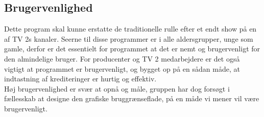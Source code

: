 \subsection{Brugervenlighed}
Dette program skal kunne erstatte de traditionelle rulle efter et endt show på en af TV 2s kanaler. Seerne til disse programmer er i alle aldersgrupper, unge som gamle, derfor er det essentielt for programmet at det er nemt og brugervenligt for den almindelige bruger. For producenter og TV 2 medarbejdere er det også vigtigt at programmet er brugervenligt, og bygget op på en sådan måde, at indtastning af krediteringer er hurtig og effektiv. \\ Høj brugervenlighed er svær at opnå og måle, gruppen har dog forsøgt i fællesskab at designe den grafiske bruggrænseflade, på en måde vi mener vil være brugervenligt. 